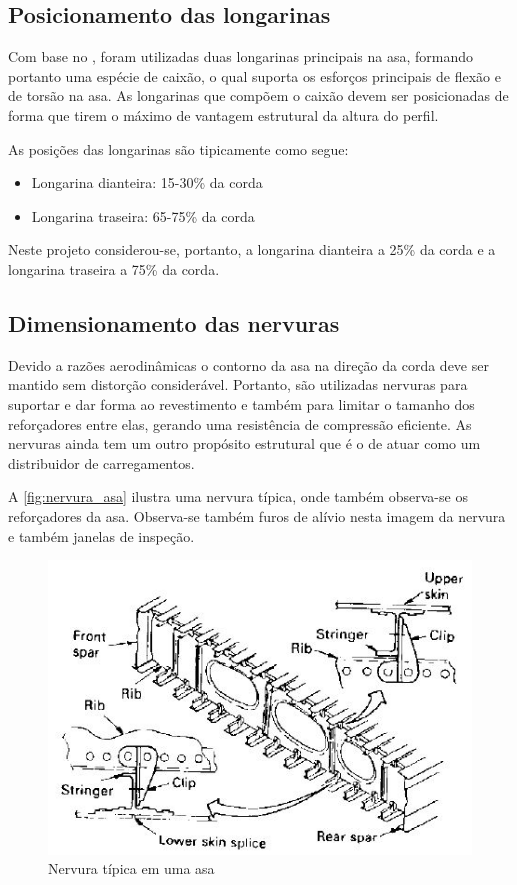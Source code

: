 \subsection{Posicionamento das longarinas}
Com base no \cite{roskam}, foram utilizadas duas longarinas principais na asa, formando portanto uma espécie de caixão, o qual suporta os esforços principais de flexão e de torsão na asa. As longarinas que compõem o caixão devem ser posicionadas de forma que tirem o máximo de vantagem estrutural da altura do perfil.

As posições das longarinas são tipicamente como segue:
\begin{itemize}
\item Longarina dianteira: 15-30\% da corda
\item Longarina traseira: 65-75\% da corda
\end{itemize}

Neste projeto considerou-se, portanto, a longarina dianteira a 25\% da corda e a longarina traseira a 75\% da corda.

\subsection{Dimensionamento das nervuras}
Devido a razões aerodinâmicas o contorno da asa na direção da corda deve ser mantido sem distorção considerável. Portanto, são utilizadas nervuras para suportar e dar forma ao revestimento e também para limitar o tamanho dos reforçadores entre elas, gerando uma resistência de compressão eficiente. As nervuras ainda tem um outro propósito estrutural que é o de atuar como um distribuidor de carregamentos.

A \autoref{fig:nervura_asa} ilustra uma nervura típica, onde também observa-se os reforçadores da asa. Observa-se também furos de alívio nesta imagem da nervura e também janelas de inspeção.

\begin{figure}
\centering
\includegraphics[width=\textwidth]{images/parte4/nervura}
\caption{Nervura típica em uma asa}
\label{fig:nervura_asa}
\end{figure}

